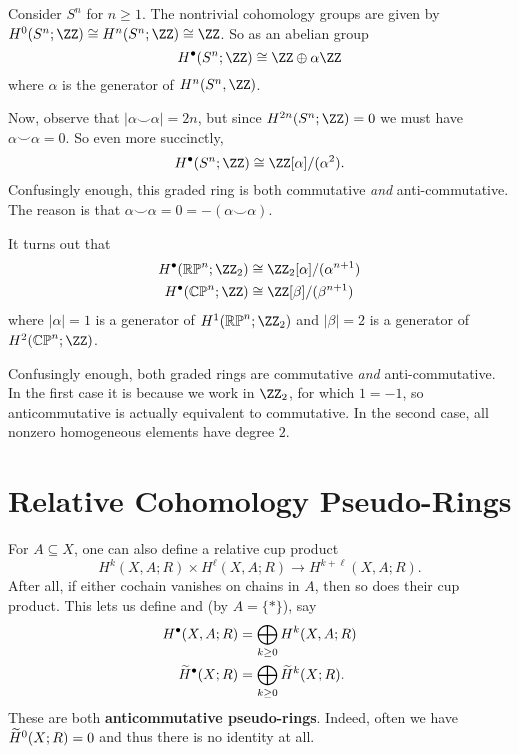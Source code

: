 \begin{example}
	Consider $S^n$ for $n \ge 1$.
	The nontrivial cohomology groups are given by
	$H^0(S^n; \ZZ) \cong H^n(S^n; \ZZ) \cong \ZZ$.
	So as an abelian group
	\[ H^\bullet(S^n; \ZZ) \cong \ZZ \oplus \alpha \ZZ \]
	where $\alpha$ is the generator of $H^n(S^n, \ZZ)$.
	
	Now, observe that $|\alpha\smile\alpha| = 2n$, but
	since $H^{2n}(S^n; \ZZ) = 0$ we must have $\alpha\smile\alpha=0$.
	So even more succinctly,
	\[ H^\bullet(S^n; \ZZ) \cong \ZZ[\alpha]/(\alpha^2). \]
	Confusingly enough, this graded ring is both
	commutative \emph{and} anti-commutative.
	The reason is that $\alpha \smile \alpha = 0 = -(\alpha \smile \alpha)$.
\end{example}

\begin{example}
	It turns out that
	\begin{align*}
		H^\bullet(\RP^n; \Zc2) &\cong \Zc2[\alpha]/(\alpha^{n+1}) \\
		H^\bullet(\CP^n; \ZZ) &\cong \ZZ[\beta]/(\beta^{n+1})
	\end{align*}
	where $|\alpha| = 1$ is a generator of $H^1(\RP^n; \Zc2)$
	and $|\beta| = 2$ is a generator of $H^2(\CP^n; \ZZ)$.

	Confusingly enough, both graded rings are commutative \emph{and} anti-commutative.
	In the first case it is because we work in $\Zc 2$, for which $1 = -1$,
	so anticommutative is actually equivalent to commutative.
	In the second case, all nonzero homogeneous elements have degree $2$.
\end{example}


\section{Relative Cohomology Pseudo-Rings}
For $A \subseteq X$, one can also define a relative cup product
\[ H^k(X,A;R) \times H^\ell(X,A;R) \to H^{k+\ell}(X,A;R). \]
After all, if either cochain vanishes on chains in $A$,
then so does their cup product.
This lets us define 
and  (by $A = \{\ast\}$), say
\begin{align*}
H^\bullet(X,A;R) &= \bigoplus_{k \ge 0} H^k(X,A; R) \\
\widetilde H^\bullet(X;R) &= \bigoplus_{k \ge 0} \widetilde H^k(X;R).
\end{align*}
These are both \textbf{anticommutative pseudo-rings}.
Indeed, often we have $\widetilde H^0(X;R) = 0$ and thus there is no identity at all.

